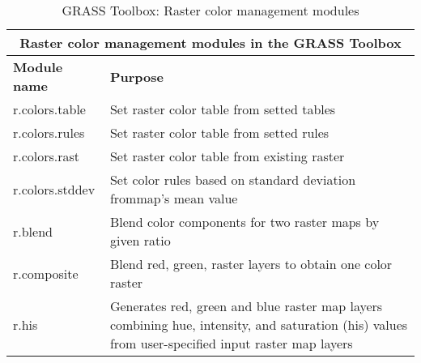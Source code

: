 \begin{table}[H]
\centering
 \begin{tabular}{|p{4cm}|p{10cm}|}
  \hline \multicolumn{2}{|c|}{\textbf{Raster color management modules in the
  GRASS Toolbox}} \\
  \hline \textbf{Module name} & \textbf{Purpose} \\
  \hline r.colors.table & Set raster color table from setted tables \\
  \hline r.colors.rules & Set raster color table from setted rules \\
  \hline r.colors.rast & Set raster color table from existing raster \\
  \hline r.colors.stddev & Set color rules based on standard deviation frommap's mean value \\
  \hline r.blend & Blend color components for two raster maps by given ratio \\
  \hline r.composite & Blend red, green, raster layers to obtain one color
  raster \\
  \hline r.his & Generates red, green and blue raster map layers combining
  hue, intensity, and saturation (his) values from user-specified input
  raster map layers \\
\hline
\end{tabular}
\caption{GRASS Toolbox: Raster color management modules}
\end{table}

